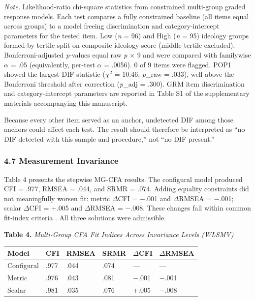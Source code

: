 \documentclass[
  12pt,
]{article}
\begin{document}
\emph{Note.} Likelihood-ratio chi-square statistics from constrained
multi-group graded response models. Each test compares a fully
constrained baseline (all items equal across groups) to a model
freeing discrimination and category-intercept parameters for the tested item.
Low (\emph{n} = 96) and High (\emph{n} = 95) ideology groups formed
by tertile split on composite ideology score (middle tertile
excluded). Bonferroni-adjusted \emph{p}-values equal raw \emph{p}
\(\times\) 9 and were compared with familywise \(\alpha\) = .05 (equivalently,
per-test \(\alpha\) = .0056). 0 of 9 items were flagged. POP1 showed the
largest DIF statistic (\(\chi^2\) = 10.46, \emph{p}\_raw = .033), well above
the Bonferroni threshold after correction (\emph{p}\_adj = .300). GRM item discrimination and
category-intercept parameters are reported in Table S1 of the supplementary
materials accompanying this manuscript.

Because every other item served as an anchor, undetected DIF among
those anchors could affect each test. The result should therefore be
interpreted as ``no DIF detected with this sample and procedure,'' not
``no DIF present.''

\hypertarget{measurement-invariance}{%
\subsubsection{4.7 Measurement Invariance}\label{measurement-invariance}}

Table 4 presents the stepwise MG-CFA results. The configural model produced CFI = .977, RMSEA = .044, and SRMR = .074. Adding equality constraints did not meaningfully worsen fit: metric \(\Delta\)CFI = $-$.001 and \(\Delta\)RMSEA = $-$.001; scalar \(\Delta\)CFI = +.005 and \(\Delta\)RMSEA = $-$.008. These changes fall within common fit-index criteria \citep{Chen2007,Cheung2002}. All three solutions were admissible.

\textbf{Table 4.} \emph{Multi-Group CFA Fit Indices Across Invariance Levels (WLSMV)}

\begin{longtable}[]{@{}llllll@{}}
\toprule
Model & CFI & RMSEA & SRMR & \(\Delta\)CFI & \(\Delta\)RMSEA \\
\midrule
\endhead
\bottomrule
\endlastfoot
Configural & .977 & .044 & .074 & --- & --- \\
Metric & .976 & .043 & .081 & $-$.001 & $-$.001 \\
Scalar & .981 & .035 & .076 & +.005 & $-$.008 \\
\end{longtable}
\end{document}
